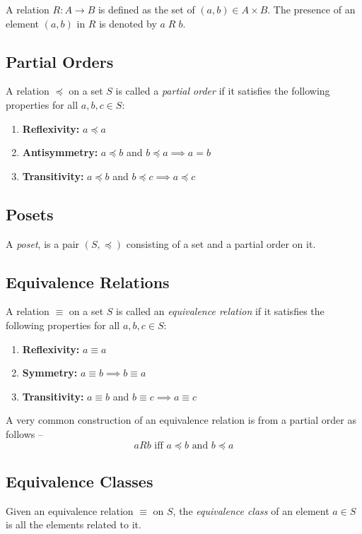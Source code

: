 A relation $R:A \to B$ is defined as the set of $(a,b) \in A \times B$. The presence of an 
element $(a,b)$ in $R$ is denoted by $a\; R \;b$.
\subsection{Partial Orders}
\label{partial_orders}
A relation $\preceq$ on a set $S$ is called a \emph{partial order} if it satisfies 
the following properties for all $a,b,c\in S$:
\begin{enumerate}
    \item \textbf{Reflexivity:} $a\preceq a$
    \item \textbf{Antisymmetry:} $a\preceq b$ and $b\preceq a \implies a=b$
    \item \textbf{Transitivity:} $a\preceq b$ and $b\preceq c \implies a\preceq c$
\end{enumerate}

\subsection*{Posets}
A \emph{poset}, is a pair $(S,\preceq)$ consisting of a set and a 
partial order on it. 

\subsection{Equivalence Relations}
\label{equivalence_classes}

A relation $\equiv$ on a set $S$ is called an \emph{equivalence relation} if it satisfies the following properties for all $a,b,c\in S$:
\begin{enumerate}
    \item \textbf{Reflexivity:} $a\equiv a$
    \item \textbf{Symmetry:} $a\equiv b \implies b\equiv a$
    \item \textbf{Transitivity:} $a\equiv b$ and $b\equiv c \implies a\equiv c$
\end{enumerate}


A very common construction of an equivalence relation is from a partial order as follows --
\[
aRb \text{  iff  } a\preceq b \text{  and  } b\preceq a
\]

\subsection*{Equivalence Classes}
Given an equivalence relation $\equiv$ on $S$, the \emph{equivalence class} of an 
element $a\in S$ is all the elements related to it.

